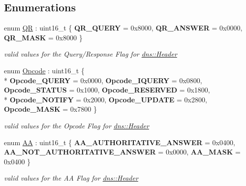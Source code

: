 \subsection*{Enumerations}
\begin{DoxyCompactItemize}
\item 
enum \hyperlink{namespacedns_a24d6c88b18b1d550ee6916c6a7ff5189}{QR} \+: uint16\+\_\+t \{ {\bfseries Q\+R\+\_\+\+Q\+U\+E\+RY} = 0x8000, 
{\bfseries Q\+R\+\_\+\+A\+N\+S\+W\+ER} = 0x0000, 
{\bfseries Q\+R\+\_\+\+M\+A\+SK} = 0x8000
 \}\hypertarget{namespacedns_a24d6c88b18b1d550ee6916c6a7ff5189}{}\label{namespacedns_a24d6c88b18b1d550ee6916c6a7ff5189}
\begin{DoxyCompactList}\small\item\em valid values for the Query/\+Response Flag for \hyperlink{structdns_1_1Header}{dns\+::\+Header} \end{DoxyCompactList}
\item 
enum \hyperlink{namespacedns_a70939facf35621c3f171e22096932b42}{Opcode} \+: uint16\+\_\+t \{ \\*
{\bfseries Opcode\+\_\+\+Q\+U\+E\+RY} = 0x0000, 
{\bfseries Opcode\+\_\+\+I\+Q\+U\+E\+RY} = 0x0800, 
{\bfseries Opcode\+\_\+\+S\+T\+A\+T\+US} = 0x1000, 
{\bfseries Opcode\+\_\+\+R\+E\+S\+E\+R\+V\+ED} = 0x1800, 
\\*
{\bfseries Opcode\+\_\+\+N\+O\+T\+I\+FY} = 0x2000, 
{\bfseries Opcode\+\_\+\+U\+P\+D\+A\+TE} = 0x2800, 
{\bfseries Opcode\+\_\+\+M\+A\+SK} = 0x7800
 \}\hypertarget{namespacedns_a70939facf35621c3f171e22096932b42}{}\label{namespacedns_a70939facf35621c3f171e22096932b42}
\begin{DoxyCompactList}\small\item\em valid values for the Opcode Flag for \hyperlink{structdns_1_1Header}{dns\+::\+Header} \end{DoxyCompactList}
\item 
enum \hyperlink{namespacedns_a2bdb22237537c460f31312616b38618a}{AA} \+: uint16\+\_\+t \{ {\bfseries A\+A\+\_\+\+A\+U\+T\+H\+O\+R\+I\+T\+A\+T\+I\+V\+E\+\_\+\+A\+N\+S\+W\+ER} = 0x0400, 
{\bfseries A\+A\+\_\+\+N\+O\+T\+\_\+\+A\+U\+T\+H\+O\+R\+I\+T\+A\+T\+I\+V\+E\+\_\+\+A\+N\+S\+W\+ER} = 0x0000, 
{\bfseries A\+A\+\_\+\+M\+A\+SK} = 0x0400
 \}\hypertarget{namespacedns_a2bdb22237537c460f31312616b38618a}{}\label{namespacedns_a2bdb22237537c460f31312616b38618a}
\begin{DoxyCompactList}\small\item\em valid values for the AA Flag for \hyperlink{structdns_1_1Header}{dns\+::\+Header} \end{DoxyCompactList}

\end{DoxyCompactItemize}
